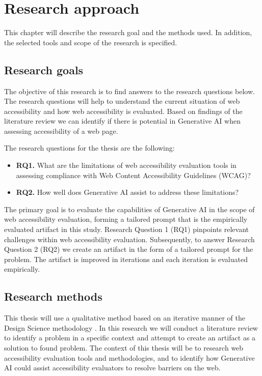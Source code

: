 \chapter{Research approach\label{methods}}

This chapter will describe the research goal and the methods used. In addition, the selected tools and scope of the research is specified.

\section{Research goals}

The objective of this research is to find answers to the research questions below. The research questions will help to understand the current situation of web accessibility and how web accessibility is evaluated. Based on findings of the literature review we can identify if there is potential in Generative AI when assessing accessibility of a web page. 

The research questions for the thesis are the following:

\begin{itemize}
    \item \textbf{RQ1.} What are the limitations of web accessibility evaluation tools in assessing compliance with Web Content Accessibility Guidelines (WCAG)?
    \item \textbf{RQ2.} How well does Generative AI assist to address these limitations?
\end{itemize}

The primary goal is to evaluate the capabilities of Generative AI in the scope of web accessibility evaluation, forming a tailored prompt that is the empirically evaluated artifact in this study. Research Question 1 (RQ1) pinpoints relevant challenges within web accessibility evaluation. Subsequently, to answer Research Question 2 (RQ2) we create an artifact in the form of a tailored prompt for the problem. The artifact is improved in iterations and each iteration is evaluated empirically.


\section{Research methods}

This thesis will use a qualitative method based on an iterative manner of the Design Science methodology \citep{designsciencemethodology, iterativedesignscience}. In this research we will conduct a literature review to identify a problem in a specific context and attempt to create an artifact as a solution to found problem. The context of this thesis will be to research web accessibility evaluation tools and methodologies, and to identify how Generative AI could assist accessibility evaluators to resolve barriers on the web. 

